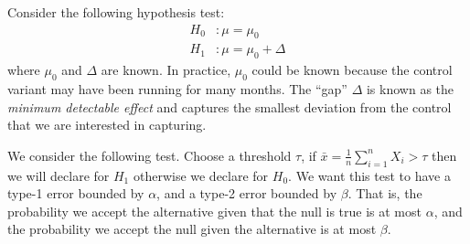 \documentclass[11pt]{article}
\newcommand{\1}{\mathbf{1}}
\begin{document}

Consider the following hypothesis test:
\begin{align*}
    H_ 0&: \mu = \mu_0\\
    H_1&: \mu = \mu_0 +\Delta
\end{align*}
where $\mu_0$ and $\Delta$ are known. In practice, $\mu_0$ could be known because the control variant may have been running for many months. The ``gap'' $\Delta$ is known as the \textit{minimum detectable effect} and captures the smallest deviation from the control that we are interested in capturing.

We consider the following test. Choose a threshold $\tau$, if $\bar{x} = \frac{1}{n}\sum_{i=1}^n X_i > \tau$ then we will declare for $H_1$ otherwise we declare for $H_0$. We want this test to have a type-1 error bounded by $\alpha$, and a type-2 error bounded by $\beta$. That is, the probability we accept the alternative given that the null is true is at most $\alpha$, and the probability we accept the null given the alternative is at most $\beta$.
\end{document}
